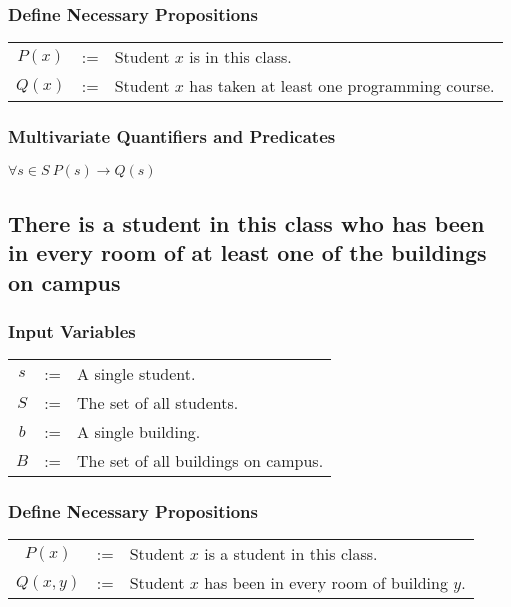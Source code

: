 \documentclass{article}
\begin{document}
\subsubsection{Define Necessary Propositions}
\begin{center}
  \begin{tabular}{ccl}
    $P(x)$ & := & Student $x$ is in this class. \\
    $Q(x)$ & := & Student $x$ has taken at least one programming course.
  \end{tabular}
\end{center}


\subsubsection{Multivariate Quantifiers and Predicates}
\begin{center}
  $ \forall s \in S~P(s) \rightarrow Q(s) $
\end{center}


\subsection{There is a student in this class who has been in every room of at least one of the buildings on campus}

\subsubsection{Input Variables}
\begin{center}
  \begin{tabular}{ccl}
    $s$ & := & A single student. \\
    $S$ & := & The set of all students. \\
    $b$ & := & A single building. \\
    $B$ & := & The set of all buildings on campus. \\
  \end{tabular}
\end{center}

\subsubsection{Define Necessary Propositions}
\begin{center}
  \begin{tabular}{ccl}
    $P(x)$ & := & Student $x$ is a student in this class. \\
    $Q(x,y)$ & := & Student $x$ has been in every room of building $y$. \\
  \end{tabular}
\end{center}
\end{document}
